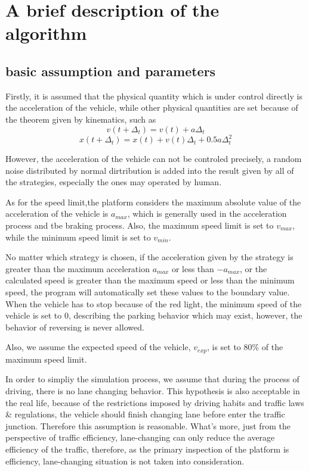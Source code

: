 \documentclass[a4paper]{paper}
\begin{document}
\section{A brief description of the algorithm}
\subsection{basic assumption and parameters}
Firstly, it is assumed that the physical quantity which is under control directly is the acceleration of the vehicle, while other physical quantities are set because of the theorem given by kinematics, such as 
$$v(t+\Delta_t)=v(t)+a\Delta_t$$
$$x(t+\Delta_t)=x(t)+v(t)\Delta_t+0.5a\Delta_t^2$$ 

However, the acceleration of the vehicle can not be controled precisely, a random noise distributed by normal dirtribution is added into the result given by all of the strategies, especially the ones may operated by human.

As for the speed limit,the platform considers the maximum absolute value of the acceleration of the vehicle is $a_{max}$, which is generally used in the acceleration process and tbe braking process. Also, the maximum speed limit is set to $v_{max}$, while the minimum speed limit is set to $v_{min}$.

No matter which strategy is chosen, if the acceleration given by the strategy is greater than the maximum acceleration $a_{max}$ or less than $-a_{max}$, or the calculated speed is greater than the maximum speed or less than the minimum speed, the program will automatically set these values to the boundary value. When the vehicle has to stop because of the red light, the minimum speed of the vehicle is set to 0, describing the parking behavior which may exist, however, the behavior of reversing is never allowed.

Also, we assume the expected speed of the vehicle, $v_{exp}$, is set to 80\% of the maximum speed limit.

In order to simpliy the simulation process, we assume that during the process of driving, there is no lane changing behavior. This hypothesis is also acceptable in the real life, because of the restrictions imposed by driving habits and traffic laws \& regulations, the vehicle should finish changing lane before enter the traffic junction. Therefore this assumption is reasonable. What's more, just from the perspective of traffic efficiency, lane-changing can only reduce the average efficiency of the traffic, therefore, as the primary inspection of the platform is efficiency, lane-changing situation is not taken into consideration.
\end{document}
